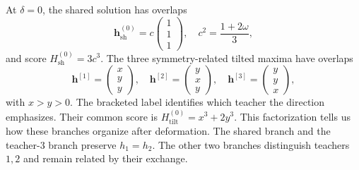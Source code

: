 \documentclass[11pt, reqno]{amsart}
\theoremstyle{notestyle}
\theoremstyle{defstyle}
\begin{document}
At $\delta = 0$, the shared solution has overlaps
\begin{equation}
    \mathbf h_{\text{sh}}^{(0)} = c\begin{pmatrix}
        1 \\ 1 \\ 1
    \end{pmatrix},\quad c^2 = \frac{1 + 2\omega}{3},
\end{equation}
and score $H_{\text{sh}}^{(0)} = 3c^3$. The three symmetry-related tilted maxima have overlaps
\begin{equation}
    \mathbf h^{[1]} = \begin{pmatrix}
        x \\ y \\ y
    \end{pmatrix},\quad \mathbf h^{[2]} = \begin{pmatrix}
        y \\ x \\ y
    \end{pmatrix},\quad \mathbf h^{[3]} = \begin{pmatrix}
        y \\ y \\ x
    \end{pmatrix},
\end{equation}
with $x > y > 0$. The bracketed label identifies which teacher the direction emphasizes. Their common score is $H_{\text{tilt}}^{(0)} = x^3 + 2y^3$. This factorization tells us how these branches organize after deformation. The shared branch and the teacher-$3$ branch preserve $h_1 = h_2$. The other two branches distinguish teachers $1, 2$ and remain related by their exchange. 
\end{document}
